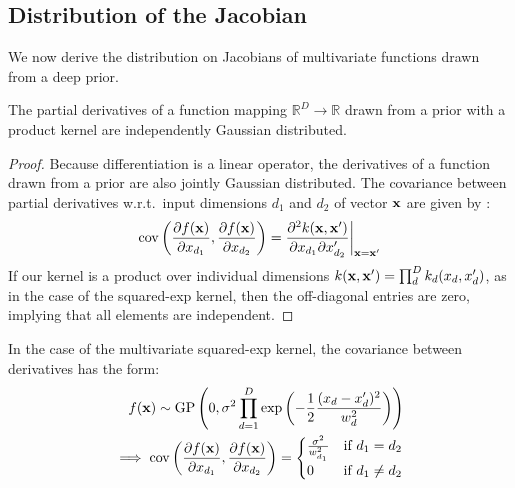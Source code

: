 \documentclass[twoside]{article}
\makeatletter
\newlength{\nonHumbleHeight}
\def\@humbleformat#1{{\settoheight{\nonHumbleHeight}{#1}\resizebox{!}{0.94\nonHumbleHeight}{#1}}}%
\newcommand\humble[1]{{\@humbleformat{#1}}}%
\newcommand{\gp}{{\humble{GP}}}
\newcommand{\lengthscale}{w}
\newcommand{\sectiondist}{}
\makeatother
\begin{document}
\subsection{Distribution of the Jacobian}
\sectiondist
\label{sec:theorem}

We now derive the distribution on Jacobians of multivariate functions drawn from a deep \gp{} prior.

\begin{lemma}
\label{thm:deriv-ind}
The partial derivatives of a function mapping $\mathbb{R}^D \rightarrow \mathbb{R}$ drawn from a \gp{} prior with a product kernel are independently Gaussian distributed.
\end{lemma}
%
\begin{proof}
Because differentiation is a linear operator, the derivatives of a function drawn from a \gp{} prior are also jointly Gaussian distributed.  The covariance between partial derivatives w.r.t.\ input dimensions $d_1$ and $d_2$ of vector ${\bf{x}}$ are given by \citet{Solak03derivativeobservations}:
%
\begin{align}
\operatorname{cov} \left( \frac{\partial f({\bf{x}})}{\partial x_{d_1}}, \frac{\partial f({\bf{x}})}{\partial x_{d_2}} \right) 
= \frac{\partial^2 k({\bf{x}}, {\bf{x}}')}{\partial x_{d_1} \partial x_{d_2}'} \bigg|_{{\bf{x}}={\bf{x}}'}
\end{align}
%
If our kernel is a product over individual dimensions $k({\bf{x}}, {\bf{x}}') = \prod_d^D k_d(x_d, x_d')$, as in the case of the squared-exp kernel, then the off-diagonal entries are zero, implying that all elements are independent.
\end{proof}

In the case of the multivariate squared-exp kernel, the covariance between derivatives has the form:
%
\begin{align}
f(\vx) \sim \textnormal{GP}\left( 0, 
\sigma^2 \prod_{d=1}^D \exp \left(-\frac{1}{2} \frac{(x_d - x_d')^2}{\lengthscale_d^2} \right) \right) \nonumber \\
 \implies 
\cov \left( \frac{\partial f(\vx)}{\partial x_{d_1}}, \frac{\partial f(\vx)}{\partial x_{d_2}} \right) =
\begin{cases} 
\frac{\sigma^2}{\lengthscale_{d_1}^2} & \mbox{if } d_1 = d_2 \\ 
0 & \mbox{if } d_1 \neq d_2 \end{cases}
\end{align}
\end{document}
